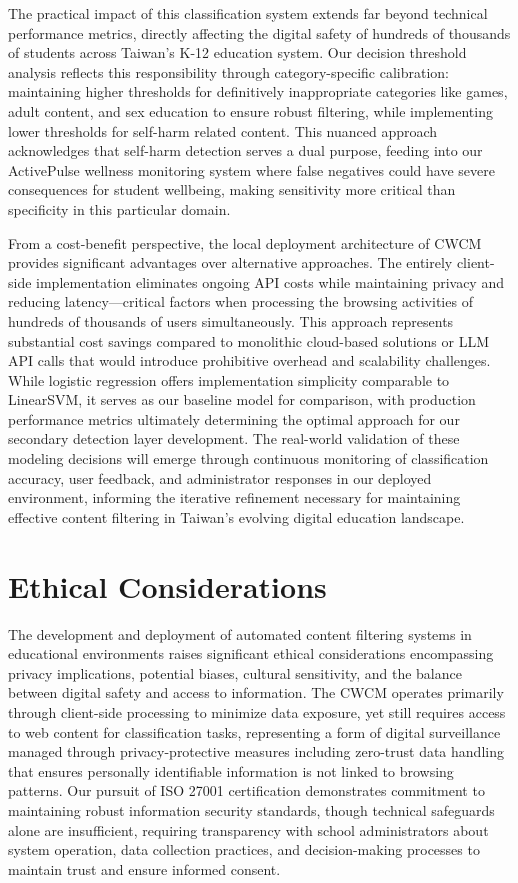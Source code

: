 \documentclass[
  titlepage]{article}
\begin{document}
The practical impact of this classification system extends far beyond
technical performance metrics, directly affecting the digital safety of
hundreds of thousands of students across Taiwan's K-12 education system.
Our decision threshold analysis reflects this responsibility through
category-specific calibration: maintaining higher thresholds for
definitively inappropriate categories like games, adult content, and sex
education to ensure robust filtering, while implementing lower
thresholds for self-harm related content. This nuanced approach
acknowledges that self-harm detection serves a dual purpose, feeding
into our ActivePulse wellness monitoring system where false negatives
could have severe consequences for student wellbeing, making sensitivity
more critical than specificity in this particular domain.

From a cost-benefit perspective, the local deployment architecture of
CWCM provides significant advantages over alternative approaches. The
entirely client-side implementation eliminates ongoing API costs while
maintaining privacy and reducing latency---critical factors when
processing the browsing activities of hundreds of thousands of users
simultaneously. This approach represents substantial cost savings
compared to monolithic cloud-based solutions or LLM API calls that would
introduce prohibitive overhead and scalability challenges. While
logistic regression offers implementation simplicity comparable to
LinearSVM, it serves as our baseline model for comparison, with
production performance metrics ultimately determining the optimal
approach for our secondary detection layer development. The real-world
validation of these modeling decisions will emerge through continuous
monitoring of classification accuracy, user feedback, and administrator
responses in our deployed environment, informing the iterative
refinement necessary for maintaining effective content filtering in
Taiwan's evolving digital education landscape.

\section{Ethical Considerations}\label{ethical-considerations}

The development and deployment of automated content filtering systems in
educational environments raises significant ethical considerations
encompassing privacy implications, potential biases, cultural
sensitivity, and the balance between digital safety and access to
information. The CWCM operates primarily through client-side processing
to minimize data exposure, yet still requires access to web content for
classification tasks, representing a form of digital surveillance
managed through privacy-protective measures including zero-trust data
handling that ensures personally identifiable information is not linked
to browsing patterns. Our pursuit of ISO 27001 certification
demonstrates commitment to maintaining robust information security
standards, though technical safeguards alone are insufficient, requiring
transparency with school administrators about system operation, data
collection practices, and decision-making processes to maintain trust
and ensure informed consent.
\end{document}
